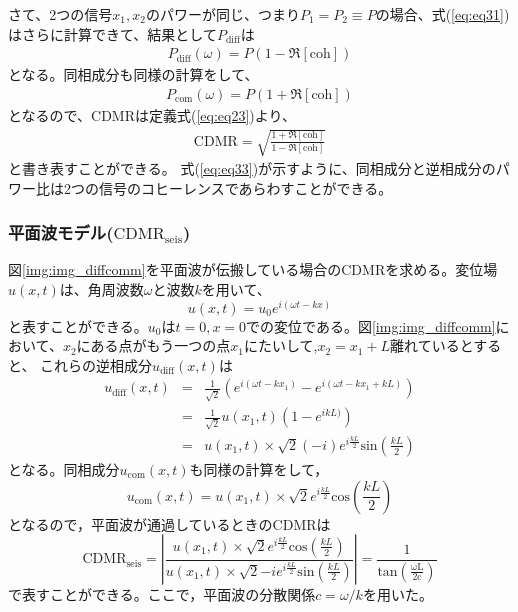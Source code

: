 さて、2つの信号$x_{1},x_{2}$のパワーが同じ、つまり$P_{1}=P_{2}\equiv P$の場合、式(\ref{eq:eq31})はさらに計算できて、結果として$P_{\mathrm{diff}}$は
\begin{eqnarray}
 P_{\mathrm{diff}}(\omega) = P \left(1 - \Re \left[\mathrm{coh} \right] \right) \label{eq:eq35}
\end{eqnarray}
となる。同相成分も同様の計算をして、
\begin{eqnarray}
 P_{\mathrm{com}}(\omega) = P \left(1 + \Re \left[\mathrm{coh} \right] \right) \label{eq:eq36}
\end{eqnarray}
となるので、$\mathrm{CDMR}$は定義式(\ref{eq:eq23})より、
\begin{eqnarray}
 \mathrm{CDMR} = \sqrt{\frac{1 + \Re \left[\mathrm{coh} \right] }{1 - \Re \left[\mathrm{coh} \right]}} \label{eq:eq33}
\end{eqnarray}
と書き表すことができる。
式(\ref{eq:eq33})が示すように、同相成分と逆相成分のパワー比は2つの信号のコヒーレンスであらわすことができる。


\subsubsection{平面波モデル($\mathrm{CDMR_{seis}}$)}
図\ref{img:img_diffcomm}を平面波が伝搬している場合のCDMRを求める。変位場$u(x,t)$は、角周波数$\omega$と波数$k$を用いて、
\begin{equation}
  u(x,t) = u_{0}e^{i(\omega{t}-k{x})}
\end{equation}
と表すことができる。$u_{0}$は$t=0,x=0$での変位である。図\ref{img:img_diffcomm}において、$x_2$にある点がもう一つの点$x_1$にたいして,$x_2=x_1+L$離れているとすると、
これらの逆相成分$u_{\mathrm{diff}}(x,t)$は
\begin{eqnarray}
  u_{\mathrm{diff}}(x,t) &=& \frac{1}{\sqrt{2}}\left( e^{i(\omega{t}-k{x_1})} -e^{i(\omega{t}-k{x_1+kL})} \right)\\
  &=& \frac{1}{\sqrt{2}}u(x_1,t)\left( 1-e^{ikL)}  \right)\\
  &=& u(x_1,t)\times{\sqrt{2}{(-i)}}e^{i\frac{kL}{2}}\mathrm{sin}(\frac{kL}{2})
\end{eqnarray}
となる。同相成分$u_\mathrm{com}(x,t)$も同様の計算をして，
\begin{equation}
  u_{\mathrm{com}}(x,t) = u(x_1,t)\times{\sqrt{2}}e^{i\frac{kL}{2}}\mathrm{cos}(\frac{kL}{2})
\end{equation}
となるので，平面波が通過しているときの$\mathrm{CDMR}$は
\begin{equation}
  \boxed{\mathrm{CDMR_{seis}} = \left| \frac{u(x_1,t)\times{\sqrt{2}}e^{i\frac{kL}{2}}\mathrm{cos}(\frac{kL}{2})}{u(x_1,t)\times{\sqrt{2}{-i}}e^{i\frac{kL}{2}}\mathrm{sin}(\frac{kL}{2})}  \right| = \frac{1}{\mathrm{tan\left( \frac{\omega{L}}{2c}  \right)}}}
  \label{eq:eq18}
\end{equation}
で表すことができる。ここで，平面波の分散関係$c=\omega/k$を用いた。


